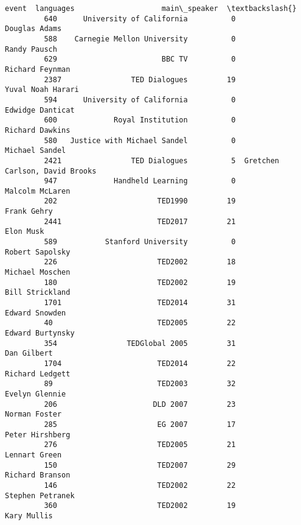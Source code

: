 \documentclass[11pt]{article}
\begin{document}
\begin{Verbatim}[commandchars=\\\{\}]
                                     event  languages                    main\_speaker  \textbackslash{}
         640      University of California          0                   Douglas Adams   
         588    Carnegie Mellon University          0                    Randy Pausch   
         629                        BBC TV          0                 Richard Feynman   
         2387                TED Dialogues         19               Yuval Noah Harari   
         594      University of California          0                Edwidge Danticat   
         600             Royal Institution          0                 Richard Dawkins   
         580   Justice with Michael Sandel          0                  Michael Sandel   
         2421                TED Dialogues          5  Gretchen Carlson, David Brooks   
         947             Handheld Learning          0                 Malcolm McLaren   
         202                       TED1990         19                     Frank Gehry   
         2441                      TED2017         21                       Elon Musk   
         589           Stanford University          0                 Robert Sapolsky   
         226                       TED2002         18                 Michael Moschen   
         180                       TED2002         19                 Bill Strickland   
         1701                      TED2014         31                  Edward Snowden   
         40                        TED2005         22                Edward Burtynsky   
         354                TEDGlobal 2005         31                     Dan Gilbert   
         1704                      TED2014         22                 Richard Ledgett   
         89                        TED2003         32                  Evelyn Glennie   
         206                      DLD 2007         23                   Norman Foster   
         285                       EG 2007         17                 Peter Hirshberg   
         276                       TED2005         21                   Lennart Green   
         150                       TED2007         29                 Richard Branson   
         146                       TED2002         22                Stephen Petranek   
         360                       TED2002         19                     Kary Mullis   
         

\end{Verbatim}
\end{document}
